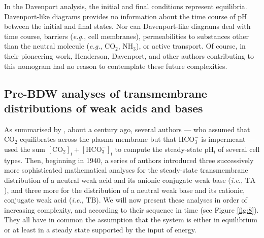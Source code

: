 \documentclass[fleqn,10pt]{physiome}
\begin{document}
In the Davenport analysis, the initial and final conditions represent equilibria. Davenport-like diagrams provides no information about the time course of $\mathrm{pH}$ between the initial and final states. Nor can Davenport-like diagrams deal with time course, barriers (\emph{e.g.}, cell membranes), permeabilities to substances other than the neutral molecule (\emph{e.g.}, $\mathrm{CO_2}$, $\mathrm{NH_3}$), or active transport. Of course, in their pioneering work, Henderson, Davenport, and other authors contributing to this nomogram had no reason to contemplate these future complexities.

\subsection{Pre-BDW analyses of transmembrane distributions of weak acids and bases}

As summarised by \cite{roos1981intracellular}, about a century ago, several authors --- who assumed that $\mathrm{CO_2}$ equilibrates across the plasma membrane but that $\mathrm{HCO_3^-}$ is impermeant --- used the sum $\mathrm{[CO_2]_i}+\mathrm{[HCO_3^-]_i}$ to compute the steady-state $\mathrm{pH_i}$ of several cell types. Then, beginning in 1940, a series of authors introduced three successively more sophisticated mathematical analyses for the steady-state transmembrane distribution of a neutral weak acid and its anionic conjugate weak base (\emph{i.e.}, $\mathrm{TA}$), and three more for the distribution of a neutral weak base and its cationic, conjugate weak acid (\emph{i.e.}, $\mathrm{TB}$). We will now present these analyses in order of increasing complexity, and according to their sequence in time (see Figure \ref{fig:8}). They all have in common the assumption that the system is either in equilibrium or at least in a steady state supported by the input of energy.
\end{document}
